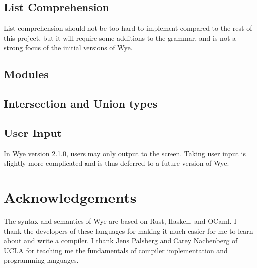 \documentclass[a4paper, 12pt]{article}
\newcommand{\version}{2.1.0}
\begin{document}
\subsection{List Comprehension}
List comprehension should not be too hard to implement compared to the rest of
this project, but it will require some additions to the grammar, and is not
a strong focus of the initial versions of Wye.

\subsection{Modules}

\subsection{Intersection and Union types}

\subsection{User Input}
In Wye version \version{}, users may only output to the screen. Taking user
input is slightly more complicated and is thus deferred to a future version of
Wye.

\pagebreak
\section{Acknowledgements}
The syntax and semantics of Wye are based on Rust, Haskell, and OCaml. I thank
the developers of these languages for making it much easier for me to learn
about and write a compiler. I thank Jens Palsberg and Carey Nachenberg of UCLA
for teaching me the fundamentals of compiler implementation and programming
languages.

\pagebreak



\end{document}

